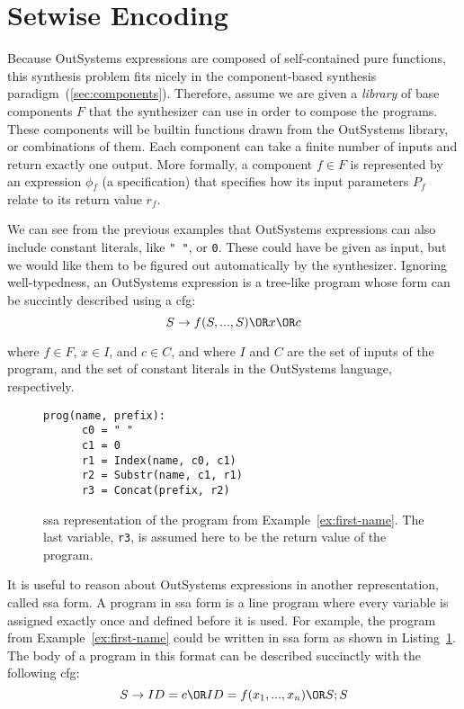 \section{Setwise Encoding}
\label{sec:setwise-encoding}

Because OutSystems expressions are composed of self-contained pure functions,
this synthesis problem fits nicely in the component-based synthesis
paradigm~(\ref{sec:components}). Therefore, assume we are given a \textit{library}
of base components $F$ that the synthesizer can use in order to compose the
programs. These components will be builtin functions drawn from the OutSystems
library, or combinations of them. Each component can take a finite number of
inputs and return exactly one output. More formally, a component $f \in F$ is
represented by an expression $\phi{}_f$ (a specification) that specifies how its
input parameters $P_f$ relate to its return value $r_f$.

We can see from the previous examples that OutSystems expressions can also
include constant literals, like \lstinline{" "}, or \lstinline{0}. These could
have be given as input, but we would like them to be figured out automatically
by the synthesizer. Ignoring well-typedness, an OutSystems expression is a
tree-like program whose form can be succintly described using a \gls{cfg}:
%
\[S \rightarrow f(S, ..., S) \OR x \OR c\]

\noindent
where $f \in F$, $x \in I$, and $c \in C$, and where $I$ and $C$ are the set of
inputs of the program, and the set of constant literals in the OutSystems
language, respectively.

\begin{figure}
  \begin{lstlisting}[frame=tlrb]
    prog(name, prefix):
      c0 = " "
      c1 = 0
      r1 = Index(name, c0, c1)
      r2 = Substr(name, c1, r1)
      r3 = Concat(prefix, r2)
  \end{lstlisting}
\caption{\gls{ssa} representation of the program from
    Example~\ref{ex:first-name}. The last variable, \lstinline{r3}, is assumed
    here to be the return value of the program.}
\label{fig:first-name-ssa}
\end{figure}

It is useful to reason about OutSystems expressions in another representation,
called \gls{ssa} form. A program in \gls{ssa} form is a line program where every
variable is assigned exactly once and defined before it is used. For example,
the program from Example~\ref{ex:first-name} could be written in \gls{ssa} form
as shown in Listing~\ref{fig:first-name-ssa}. The body of a program in this
format can be described succinctly with the following \gls{cfg}:
%
\[S \to ID = c \OR ID = f(x_1, ..., x_n) \OR S;S\]

